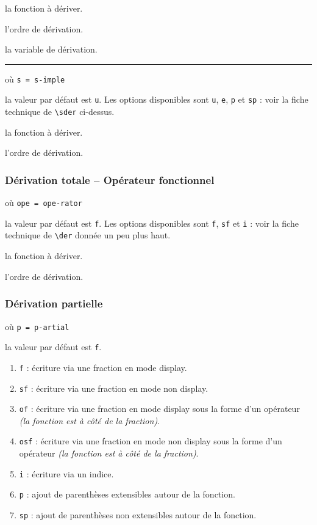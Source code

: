 \documentclass[12pt,a4paper]{article}
\newcommand\env[1]{\texttt{#1}}
\newcommand\macro[1]{\env{\textbackslash{}#1}}
\theoremstyle{definition}
\newcommand\separation{
	\medskip
	\hfill\rule{0.5\textwidth}{0.75pt}\hfill
	\medskip
}
\newcommand\mwhyprefix[2]{%
	\texttt{#1 = #1-#2}%
}
\begin{document}
 la fonction à dériver.

 l'ordre de dérivation.

 la variable de dérivation.


\separation


 où \quad \mwhyprefix{s}{imple}

\IDoption{} la valeur par défaut est \verb+u+. Les options disponibles sont \verb+u+, \verb+e+, \verb+p+ et \verb+sp+ : voir la fiche technique de \macro{sder} ci-dessus.

 la fonction à dériver.

 l'ordre de dérivation.




\subsubsection{Dérivation totale -- Opérateur fonctionnel}

 où \quad \mwhyprefix{ope}{rator}

\IDoption{} la valeur par défaut est \verb+f+. Les options disponibles sont \verb+f+, \verb+sf+ et \verb+i+ : voir la fiche technique de \macro{der} donnée un peu plus haut.

 la fonction à dériver.

 l'ordre de dérivation.
\subsubsection{Dérivation partielle}

 où \quad \mwhyprefix{p}{artial}

\IDoption{} la valeur par défaut est \verb+f+. 
\begin{enumerate}
	\item \verb+f+ : écriture via une fraction en mode display.

	\item \verb+sf+ : écriture via une fraction en mode non display.

	\item \verb+of+ : écriture via une fraction en mode display sous la forme d'un opérateur \emph{(la fonction est à côté de la fraction)}.

	\item \verb+osf+ : écriture via une fraction en mode non display sous la forme d'un opérateur \emph{(la fonction est à côté de la fraction)}.

	\item \verb+i+ : écriture via un indice.

	\smallskip
	\item \verb+p+ : ajout de parenthèses extensibles autour de la fonction.

	\item \verb+sp+ : ajout de parenthèses non extensibles autour de la fonction.
\end{enumerate}
\end{document}
